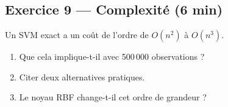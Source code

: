 \subsection*{Exercice 9 --- Complexité \hfill \normalfont\footnotesize (6 min)}
Un SVM exact a un coût de l'ordre de $O(n^2)$ à $O(n^3)$.
\begin{enumerate}
  \item Que cela implique-t-il avec 500\,000 observations ?
  \item Citer deux alternatives pratiques.
  \item Le noyau RBF change-t-il cet ordre de grandeur ?
\end{enumerate}

\newpage

